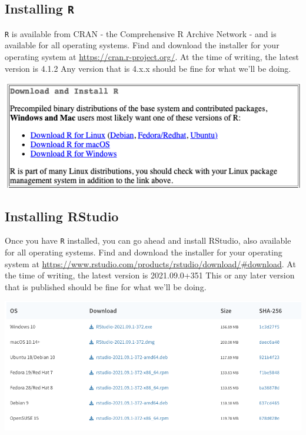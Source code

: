 \documentclass[
]{book}
\begin{document}
\hypertarget{installing-r}{%
\subsection*{\texorpdfstring{Installing \texttt{R}}{Installing R}}\label{installing-r}}

\texttt{R} is available from CRAN - the Comprehensive R Archive Network - and is available for all operating systems. Find and download the installer for your operating system at \url{https://cran.r-project.org/}. At the time of writing, the latest version is 4.1.2 Any version that is 4.x.x should be fine for what we'll be doing.

\includegraphics{images/Install-R_20220101.png}

\hypertarget{installing-rstudio}{%
\subsection*{Installing RStudio}\label{installing-rstudio}}

Once you have \texttt{R} installed, you can go ahead and install RStudio, also available for all operating systems. Find and download the installer for your operating system at \url{https://www.rstudio.com/products/rstudio/download/\#download}. At the time of writing, the latest version is 2021.09.0+351 This or any later version that is published should be fine for what we'll be doing.

\includegraphics{images/Install-RStudio_20220101.png}
\end{document}
